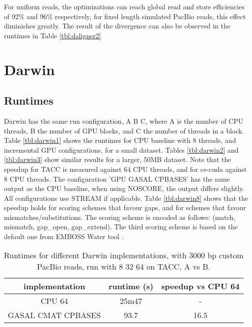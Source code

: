 \documentclass[../main/thesis.tex]{subfiles}
\begin{document}
For uniform reads, the optimizations can reach global read and store efficiencies of 92\% and 96\% respectively, for fixed length simulated PacBio reads, this effect diminishes greatly.
The result of the divergence can also be observed in the runtimes in Table \ref{tbl:daligner2}


\section{Darwin}
\subsection{Runtimes}
Darwin has the same run configuration, A B C, where A is the number of CPU threads, B the number of GPU blocks, and C the number of threads in a block.
Table \ref{tbl:darwin1} shows the runtimes for CPU baseline with 8 threads, and incremental GPU configurations, for a small dataset.
Tables \ref{tbl:darwin2} and \ref{tbl:darwin3} show similar results for a larger, 50MB dataset.
Note that the speedup for TACC is measured against 64 CPU threads, and for ce-cuda against 8 CPU threads.
The configuration 'GPU GASAL CPBASES' has the same output as the CPU baseline, when using NOSCORE, the output differs slightly.
All configurations use STREAM if applicable.
Table \ref{tbl:darwin8} shows that the speedup holds for scoring schemes that favour gaps, and for schemes that favour mismatches/substitutions.
The scoring scheme is encoded as follows: (match, mismatch, gap\_open, gap\_extend).
The third scoring scheme is based on the default one from EMBOSS Water tool \cite{emboss}.

\begin{table}
\centering
\caption{Runtimes for different Darwin implementations, with 3000 bp custom PacBio reads, run with 8 32 64 on TACC, A vs B.}
\label{tbl:darwin0}
\begin{tabular}{c c c}
implementation & runtime (s) & speedup vs CPU 64 \\ \hline
CPU 64 & 25m47 & -\\
GASAL CMAT CPBASES & 93.7 & 16.5 \\
\end{tabular}
\end{table}
\end{document}
